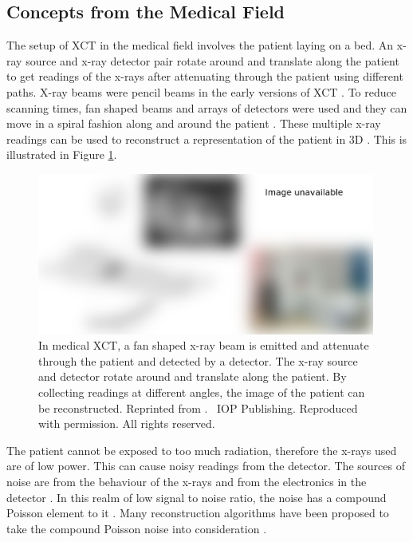 \subsection{Concepts from the Medical Field}

The setup of XCT \citep{cormack1973reconstruction, hounsfield1973computerized, hounsfield1980computed} in the medical field involves the patient laying on a bed. An x-ray source and x-ray detector pair rotate around and translate along the patient to get readings of the x-rays after attenuating through the patient using different paths. X-ray beams were pencil beams in the early versions of XCT \citep{michael2001x}. To reduce scanning times, fan shaped beams and arrays of detectors were used and they can move in a spiral fashion along and around the patient \citep{cierniak2011x}. These multiple x-ray readings can be used to reconstruct a representation of the patient in 3D \citep{zeng2010medical}. This is illustrated in Figure \ref{fig:literature_medicalct}.

\begin{figure}
  \centering
  \includegraphics[width=0.99\textwidth]{../figures/literatureReview/literature_medicalct.png}
  \caption{In medical XCT, a fan shaped x-ray beam is emitted and attenuate through the patient and detected by a detector. The x-ray source and detector rotate around and translate along the patient. By collecting readings at different angles, the image of the patient can be reconstructed. Reprinted from \cite{michael2001x}. \textcopyright\ IOP Publishing. Reproduced with permission. All rights reserved.}
  \label{fig:literature_medicalct}
\end{figure}

The patient cannot be exposed to too much radiation, therefore the x-rays used are of low power. This can cause noisy readings from the detector. The sources of noise are from the behaviour of the x-rays and from the electronics in the detector \citep{yang2010noise}. In this realm of low signal to noise ratio, the noise has a compound Poisson element to it \citep{whiting2002signal, whiting2006properties}. Many reconstruction algorithms have been proposed to take the compound Poisson noise into consideration \citep{elbakri2002statistical, elbakri2003efficient, elbakri2003statistical, lasio2007statistical, xie2008x}.

